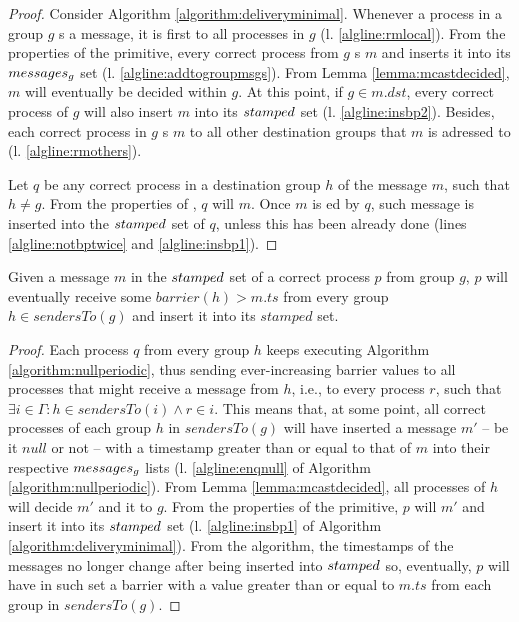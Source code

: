 \documentclass[times, 10pt]{article}
\begin{document}
\begin{proof}
Consider Algorithm \ref{algorithm:deliveryminimal}. Whenever a process in a group $g$ \amcast{}s a message, it is first \rmcast{} to all processes in $g$ (l. \ref{algline:rmlocal}). From the properties of the \rmcast{} primitive, every correct process from $g$ \rmdel{}s $m$ and inserts it into its $messages\text{$_g$}$ set (l. \ref{algline:addtogroupmsgs}). From Lemma \ref{lemma:mcastdecided}, $m$ will eventually be decided within $g$. At this point, if $g \in m.dst$, every correct process of $g$ will also insert $m$ into its $stamped$ set (l. \ref{algline:insbp2}). Besides, each correct process in $g$ \rmcast{}s $m$ to all other destination groups that $m$ is adressed to (l. \ref{algline:rmothers}).

Let $q$ be any correct process in a destination group $h$ of the message $m$, such that $h \neq g$. From the properties of \rmcast{}, $q$ will \rmdel{} $m$. Once $m$ is \rmdel{}ed by $q$, such message is inserted into the $stamped$ set of $q$, unless this has been already done (lines \ref{algline:notbptwice} and \ref{algline:insbp1}).
\end{proof}



\begin{lems} \label{lemma:barrierperiodic}
  Given a message $m$ in the $stamped$ set of a correct process $p$ from group $g$, $p$ will eventually receive some $barrier(h) > m.ts$ from every group $h \in sendersTo(g)$ and insert it into its $stamped$ set.
\end{lems}

\begin{proof}Each process $q$ from every group $h$ keeps executing Algorithm \ref{algorithm:nullperiodic}, thus sending ever-increasing barrier values to all processes that might receive a message from $h$, i.e., to every process $r$, such that $\exists i \in \Gamma: h \in sendersTo(i) \wedge r \in i$. %
This means that, at some point, all correct processes of each group $h$ in $sendersTo(g)$ will have inserted a message $m'$ -- be it $null$ or not -- with a timestamp greater than or equal to that of $m$ into their respective $messages\text{$_g$}$ lists (l. \ref{algline:enqnull} of Algorithm \ref{algorithm:nullperiodic}). From Lemma \ref{lemma:mcastdecided}, all processes of $h$ will decide $m'$ and \rmcast{} it to $g$. From the properties of the \rmcast{} primitive, $p$ will \rmdel{} $m'$ and insert it into its $stamped$ set (l. \ref{algline:insbp1} of Algorithm \ref{algorithm:deliveryminimal}). From the algorithm, the timestamps of the messages no longer change after being inserted into $stamped$ so, eventually, $p$ will have in such set a barrier with a value greater than or equal to $m.ts$ from each group in $sendersTo(g)$.\end{proof}
\end{document}
